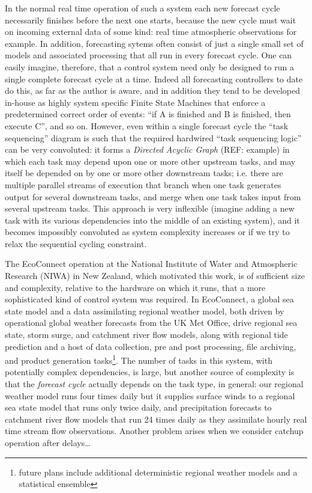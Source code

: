 \documentclass[11pt,a4paper]{article}
\begin{document}
In the normal real time operation of such a system each new forecast
cycle necessarily finishes before the next one starts, because the new
cycle must wait on incoming external data of some kind: real time
atmospheric observations for example. In addition, forecasting sytems
often consist of just a single small set of models and associated
processing that all run in every forecast cycle. One can easily imagine,
therefore, that a control system need only be designed to run a single
complete forecast cycle at a time. Indeed all forecasting controllers to
date do this, as far as the author is aware, and in addition they tend
to be developed in-house as highly system specific Finite State Machines
that enforce a predetermined correct order of events: ``if A is finished
and B is finished, then execute C'', and so on.  However, even within a
single forecast cycle the ``task sequencing'' diagram is such that the
required hardwired ``task sequencing logic'' can be very convoluted: it
forms a {\em Directed Acyclic Graph} (REF: example) in which each task
may depend upon one or more other upstream tasks, and may itself be
depended on by one or more other downstream tasks; i.e. there are
multiple parallel streams of execution that branch when one task
generates output for several downstream tasks, and merge when one task
takes input from several upstream tasks. This approach is very
inflexible (imagine adding a new task with its various dependencies into
the middle of an existing system), and it becomes impossibly convoluted
as system complexity increases or if we try to relax the sequential
cycling constraint.

The EcoConnect operation at the National Institute of Water and
Atmospheric Research (NIWA) in New Zealand, which motivated this work,
is of sufficient size and complexity, relative to the hardware on which
it runs, that a more sophisticated kind of control system was required.
In EcoConnect, a global sea state model and a data assimilating regional
weather model, both driven by operational global weather forecasts from
the UK Met Office, drive regional sea state, storm surge, and catchment
river flow models, along with regional tide prediction and a host of
data collection, pre and post processing, file archiving, and product
generation tasks\footnote{future plans include additional deterministic
regional weather models and a statistical ensemble}. The number of tasks
in this system, with potentially complex dependencies, is large, but
another source of complexity is that the {\em forecast cycle} actually
depends on the task type, in general: our regional weather model runs
four times daily but it supplies surface winds to a regional sea state
model that runs only twice daily, and precipitation forecasts to
catchment river flow models that run 24 times daily as they assimilate
hourly real time stream flow observations. Another problem arises when
we consider catchup operation after delays\dots
\end{document}
